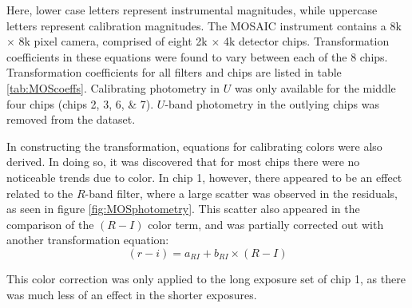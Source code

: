 \documentclass[iop]{emulateapj}
\begin{document}
Here, lower case letters represent instrumental magnitudes, while uppercase letters represent calibration magnitudes. The MOSAIC instrument contains a 8k $\times$ 8k pixel camera, comprised of eight 2k $\times$ 4k detector chips. Transformation coefficients in these equations were found to vary between each of the 8 chips. Transformation coefficients for all filters and chips are listed in table \ref{tab:MOScoeffs}. Calibrating photometry in $U$ was only available for the middle four chips (chips 2, 3, 6, \& 7). $U$-band photometry in the outlying chips was removed from the dataset. 

In constructing the transformation, equations for calibrating colors were also derived. In doing so, it was discovered that for most chips there were no noticeable trends due to color. In chip 1, however, there appeared to be an effect related to the $R$-band filter, where a large scatter was observed in the residuals, as seen in figure \ref{fig:MOSphotometry}. This scatter also appeared in the comparison of the $(R-I)$ color term, and was partially corrected out with another transformation equation:
\begin{equation}
	(r-i) = a_{RI} + b_{RI} \times (R-I)
\end{equation} 

This color correction was only applied to the long exposure set of chip 1, as there was much less of an effect in the shorter exposures.
\end{document}
